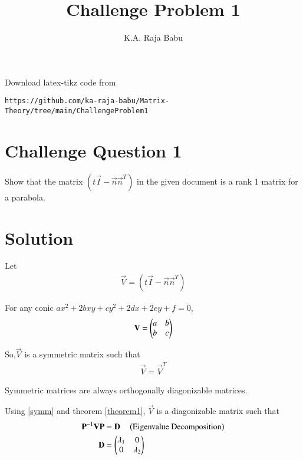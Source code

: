 \documentclass[journal,12pt,twocolumn]{IEEEtran}
\begin{document}
     \def\rightbox#1{\makebox[0in][r]{#1}}
     \def\centbox#1{\makebox[0in]{#1}}
     \def\topbox#1{\raisebox{-\baselineskip}[0in][0in]{#1}}
     \def\midbox#1{\raisebox{-0.5\baselineskip}[0in][0in]{#1}}
\vspace{3cm}
\title{Challenge Problem 1}
\author{K.A. Raja Babu}
\maketitle
\newpage
\bigskip
\renewcommand{\thefigure}{\theenumi}
\renewcommand{\thetable}{\theenumi}
Download latex-tikz code from 
%
\begin{lstlisting}
https://github.com/ka-raja-babu/Matrix-Theory/tree/main/ChallengeProblem1
\end{lstlisting}
%
\section{Challenge Question 1}
Show that the matrix $(t\vec{I}-\vec{n}\vec{n}^T)$ in the given document is a rank 1 matrix for a parabola.
%
\section{Solution}
Let
\begin{align}
    \vec{V} = (t\vec{I}-\vec{n}\vec{n}^T) 
\end{align}

For any conic $ax^2 + 2bxy + cy^2 + 2dx + 2ey + f = 0$,
\begin{align}
    \mathbf{V} = \begin{pmatrix}a & b \\ b & c\end{pmatrix}
\end{align}

So,$\vec{V}$ is a symmetric matrix such that
\begin{align}
    \vec{V} = \vec{V}^T \label{symm}
\end{align}

\begin{theorem}
\label{theorem1}
Symmetric matrices are always orthogonally diagonizable matrices.
\end{theorem}

Using \eqref{symm} and theorem \ref{theorem1}, $\vec{V}$ is a diagonizable matrix such that
\begin{align}
    \mathbf{P}^{-1}\mathbf{V}\mathbf{P} &= \mathbf{D}  \quad \left(\text{Eigenvalue Decomposition}\right)
    \\
    \mathbf{D} &= \begin{pmatrix}\lambda_1 & 0 \\ 0 & \lambda_2\end{pmatrix}
\end{align}
\end{document}
